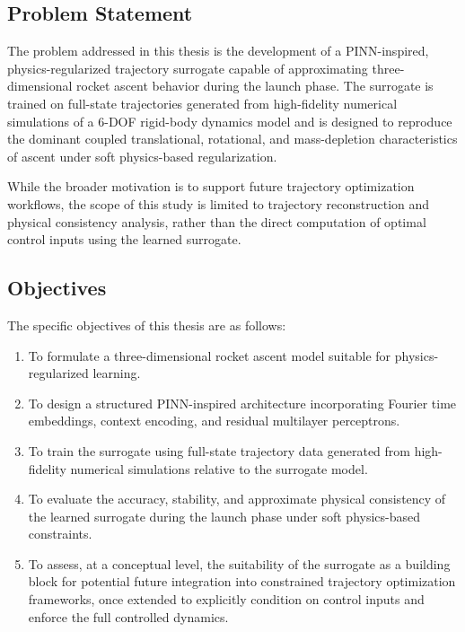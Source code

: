 \subsection{Problem Statement}

The problem addressed in this thesis is the development of a PINN-inspired, physics-regularized 
trajectory surrogate capable of approximating three-dimensional rocket ascent behavior during 
the launch phase. The surrogate is trained on full-state trajectories generated from high-fidelity 
numerical simulations of a 6-DOF rigid-body dynamics model and is designed to reproduce the dominant 
coupled translational, rotational, and mass-depletion characteristics of ascent under soft physics-based 
regularization.

While the broader motivation is to support future trajectory optimization workflows, the scope of 
this study is limited to trajectory reconstruction and physical consistency analysis, rather than the 
direct computation of optimal control inputs using the learned surrogate.

\subsection{Objectives}

The specific objectives of this thesis are as follows:
\begin{enumerate}
  \item To formulate a three-dimensional rocket ascent model suitable for
        physics-regularized learning.
  \item To design a structured PINN-inspired architecture incorporating Fourier time
        embeddings, context encoding, and residual multilayer perceptrons.
  \item To train the surrogate using full-state trajectory data generated from 
        high-fidelity numerical simulations relative to the surrogate model.
  \item To evaluate the accuracy, stability, and approximate physical consistency of the
        learned surrogate during the launch phase under soft physics-based constraints.
  \item To assess, at a conceptual level, the suitability of the surrogate as a building block
        for potential future integration into constrained trajectory optimization frameworks,
        once extended to explicitly condition on control inputs and enforce the full controlled dynamics.
\end{enumerate}

